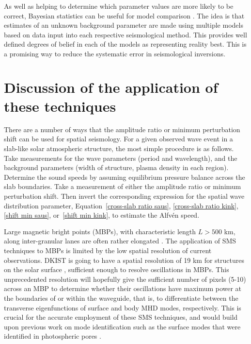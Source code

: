 \documentclass[12pt]{../style-files/ociamthesis}
\begin{document}
As well as helping to determine which parameter values are more likely to be correct, Bayesian statistics can be useful for model comparison \citep{arr_etal18}. The idea is that estimates of an unknown background parameter are made using multiple models based on data input into each respective seismological method. This provides well defined degrees of belief in each of the models as representing reality best. This is a promising way to reduce the systematic error in seismological inversions.


\section{Discussion of the application of these techniques}
\label{sec: }


\color{red}
There are a number of ways that the amplitude ratio or minimum perturbation shift can be used for spatial seismology. For a given observed wave event in a slab-like solar atmospheric structure, the most simple procedure is as follows. Take measurements for the wave parameters (period and wavelength), and the background parameters (width of structure, plasma density in each region). Determine the sound speeds by assuming equilibrium pressure balance across the slab boundaries. Take a measurement of either the amplitude ratio or minimum perturbation shift. Then invert the corresponding expression for the spatial wave distribution parameter, Equation~\eqref{cross-slab ratio saus}, \eqref{cross-slab ratio kink}, \eqref{shift min saus}, or~\eqref{shift min kink}, to estimate the Alfv\'{e}n speed.





Large magnetic bright points (MBPs), with characteristic length $L > 500$ km, along inter-granular lanes are often rather elongated \citep{cro_etal10}. The application of SMS techniques to MBPs is limited by the low spatial resolution of current observations. DKIST is going to have a spatial resolution of 19 km for structures on the solar surface \citep{tri_etal15}, sufficient enough to resolve oscillations in MBPs. This unprecedented resolution will hopefully give the sufficient number of pixels (5-10) across an MBP to determine whether their oscillations have maximum power at the boundaries of or within the waveguide, that is, to differentiate between the transverse eigenfunctions of surface and body MHD modes, respectively. This is crucial for the accurate employment of these SMS techniques, and would build upon previous work on mode identification such as the surface modes that were identified in photospheric pores \citep{mor_etal15}.
\end{document}
